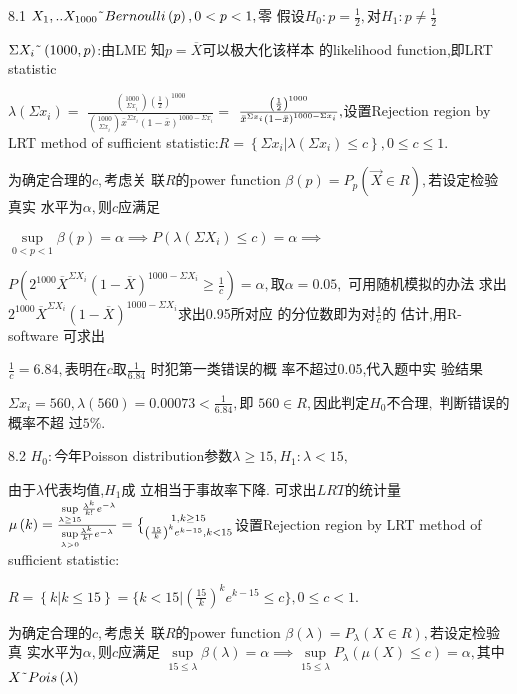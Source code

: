 \documentclass{ctexart}
\def\QATOPD#1#2#3#4{{#3 \atopwithdelims#1#2 #4}}%
\begin{document}
8.1 $X_{1},..X_{1000}\symbol{126}Bernoulli\left( p\right) ,0<p<1,$零%
假设$H_{0}:p=\frac{1}{2},$对$H_{1}:p\neq \frac{1}{2}$

$\Sigma X_{i}\symbol{126}\left( 1000,p\right) $:由LME 知$p=%
\overline{X}$可以极大化该样本%
的likelihood function,即LRT statistic

$\lambda \left( \Sigma x_{i}\right) =$ $\frac{\binom{1000}{\Sigma x_{i}}%
\left( \frac{1}{2}\right) ^{1000}}{\binom{1000}{\Sigma x_{i}}\bar{x}^{\Sigma
x_{i}}\left( 1-\bar{x}\right) ^{1000-\Sigma x_{i}}}=$ $\frac{\left( \frac{1}{%
2}\right) ^{1000}}{\bar{x}^{\Sigma x_{i}}\left( 1-\bar{x}\right)
^{1000-\Sigma x_{i}}},$设置Rejection region by LRT method of
sufficient statistic:$R=\left\{ \Sigma x_{i}|\lambda \left( \Sigma
x_{i}\right) \leq c\right\} ,0\leq c\leq 1.$

为确定合理的$c,$考虑关%
联$R$的power function $\beta \left( p\right) =P_{p}\left( \vec{X}%
\in R\right) ,$若设定检验真实%
水平为$\alpha ,$则$c$应满足

$\underset{0<p<1}{\sup }\beta \left( p\right) =\alpha \implies P\left(
\lambda \left( \Sigma X_{i}\right) \leq c\right) =\alpha \implies $

$P\left( 2^{1000}\overline{X}^{\Sigma X_{i}}\left( 1-\overline{X}\right)
^{1000-\Sigma X_{i}}\geq \frac{1}{c}\right) =\alpha ,$取$\alpha =0.05,$%
可用随机模拟的办法%
求出$2^{1000}\overline{X}^{\Sigma X_{i}}\left( 1-\overline{X}%
\right) ^{1000-\Sigma X_{i}}$求出0.95所对应%
的分位数即为对$\frac{1}{c}$的%
估计,用R-software 可求出

$\frac{1}{c}=6.84,$表明在$c$取$\frac{1}{6.84}$%
时犯第一类错误的概%
率不超过0.05,代入题中实%
验结果

$\Sigma x_{i}=560,\lambda \left( 560\right) =0.00073<\frac{1}{6.84},$即%
$560\in R,$因此判定$H_{0}$不合理$,$%
判断错误的概率不超%
过$5\%.$

8.2 $H_{0}:$今年Poisson distribution参数$\lambda
\geq 15,H_{1}:\lambda <15,$

由于$\lambda $代表均值,$H_{1}$成%
立相当于事故率下降. 
可求出$LRT$的统计量$\mu \left(
k\right) =\frac{\underset{\lambda \geq 15}{\sup }\frac{\lambda ^{k}}{k!}%
e^{-\lambda }}{\underset{\lambda >0}{\sup }\frac{\lambda ^{k}}{k!}%
e^{-\lambda }}=\QATOPD\{ . {1,k\geq 15}{\left( \frac{15}{k}\right)
^{k}e^{k-15},k<15}$设置Rejection region by LRT method of
sufficient statistic:

$R=\left\{ k|k\leq 15\right\} =\{k<15|\left( \frac{15}{k}\right)
^{k}e^{k-15}\leq c\},0\leq c<1.$

为确定合理的$c,$考虑关%
联$R$的power function $\beta \left( \lambda \right) =P_{\lambda
}\left( X\in R\right) ,$若设定检验真%
实水平为$\alpha ,$则$c$应满足%
$\underset{15\leq \lambda }{\sup }\beta \left( \lambda \right) =\alpha
\implies \underset{15\leq \lambda }{\sup }P_{\lambda }\left( \mu \left(
X\right) \leq c\right) =\alpha ,$其中$X\symbol{126}Pois\left(
\lambda \right) $
\end{document}

